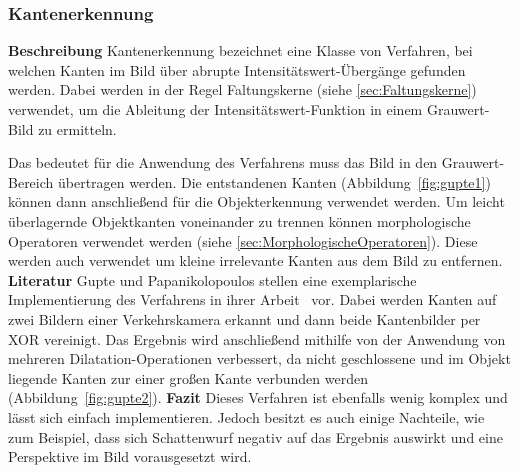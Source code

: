 \subsubsection{Kantenerkennung}
\textbf{Beschreibung}\newline
Kantenerkennung bezeichnet eine Klasse von Verfahren, bei welchen Kanten im Bild über abrupte Intensitätswert-Übergänge gefunden werden. 
Dabei werden in der Regel Faltungskerne (siehe \ref{sec:Faltungskerne}) verwendet, um die Ableitung der Intensitätswert-Funktion in einem Grauwert-Bild zu ermitteln.

Das bedeutet für die Anwendung des Verfahrens muss das Bild in den Grauwert-Bereich übertragen werden.
Die entstandenen Kanten (Abbildung~\ref{fig:gupte1}) können dann anschließend für die Objekterkennung verwendet werden. 
Um leicht überlagernde Objektkanten voneinander zu trennen können morphologische Operatoren verwendet werden (siehe \ref{sec:MorphologischeOperatoren}).
Diese werden auch verwendet um kleine irrelevante Kanten aus dem Bild zu entfernen.
\newline\newline
\textbf{Literatur}\newline
Gupte und Papanikolopoulos stellen eine exemplarische Implementierung  des Verfahrens in ihrer Arbeit~\cite{gupte2000algorithms} vor. Dabei werden Kanten auf zwei Bildern einer Verkehrskamera erkannt und dann beide Kantenbilder per XOR vereinigt. Das Ergebnis wird anschließend mithilfe von der Anwendung von mehreren Dilatation-Operationen verbessert, da nicht geschlossene und im Objekt liegende Kanten zur einer großen Kante verbunden werden (Abbildung~\ref{fig:gupte2}).
\newline\newline
\textbf{Fazit}\newline
Dieses Verfahren ist ebenfalls wenig komplex und lässt sich einfach implementieren. 
Jedoch besitzt es auch einige Nachteile, wie zum Beispiel, dass sich Schattenwurf negativ auf das Ergebnis auswirkt und eine Perspektive im Bild vorausgesetzt wird.

